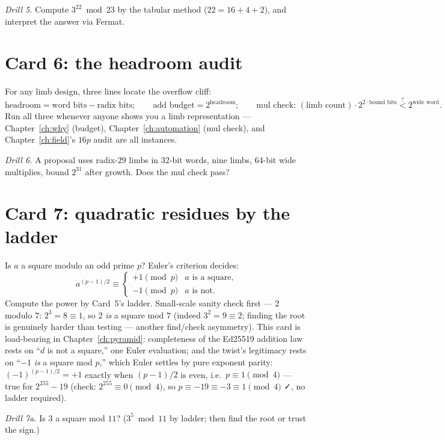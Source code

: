 \emph{Drill 5.} Compute $3^{22} \bmod 23$ by the tabular method
($22 = 16 + 4 + 2$), and interpret the answer via Fermat.

\section{Card 6: the headroom audit}

For any limb design, three lines locate the overflow cliff:
\[
\text{headroom} = \text{word bits} - \text{radix bits}; \qquad
\text{add budget} = 2^{\text{headroom}}; \qquad
\text{mul check: } (\text{limb count}) \cdot 2^{2\cdot\text{bound bits}}
\overset{?}{<} 2^{\text{wide word}} .
\]
Run all three whenever anyone shows you a limb representation ---
Chapter~\ref{ch:why} (budget), Chapter~\ref{ch:automation} (mul check),
and Chapter~\ref{ch:field}'s $16p$ audit are all instances.

\emph{Drill 6.} A proposal uses radix-$29$ limbs in 32-bit words, nine
limbs, 64-bit wide multiplies, bound $2^{31}$ after growth. Does the mul
check pass?

\section{Card 7: quadratic residues by the ladder}

Is $a$ a square modulo an odd prime $p$? Euler's criterion decides:
\[
a^{(p-1)/2} \equiv
\begin{cases}
+1 \pmod p & a \text{ is a square,}\\
-1 \pmod p & a \text{ is not.}
\end{cases}
\]
Compute the power by Card~5's ladder. Small-scale sanity check first
--- $2$ modulo $7$: $2^{3} = 8 \equiv 1$, so $2$ \emph{is} a square mod
$7$ (indeed $3^2 = 9 \equiv 2$; finding the root is genuinely harder
than testing --- another find/check asymmetry). This card is
load-bearing in Chapter~\ref{ch:pyramid}: completeness of the Ed25519
addition law rests on ``$d$ is not a square,'' one Euler evaluation;
and the twist's legitimacy rests on ``$-1$ \emph{is} a square mod
$p$,'' which Euler settles by pure exponent parity:
$(-1)^{(p-1)/2} = +1$ exactly when $(p-1)/2$ is even, i.e.\
$p \equiv 1 \pmod 4$ --- true for $2^{255} - 19$ (check:
$2^{255} \equiv 0 \pmod 4$, so $p \equiv -19 \equiv -3 \equiv
1 \pmod 4$ ✓, no ladder required).

\emph{Drill 7a.} Is $3$ a square mod $11$? ($3^5 \bmod 11$ by ladder;
then find the root or trust the sign.)

